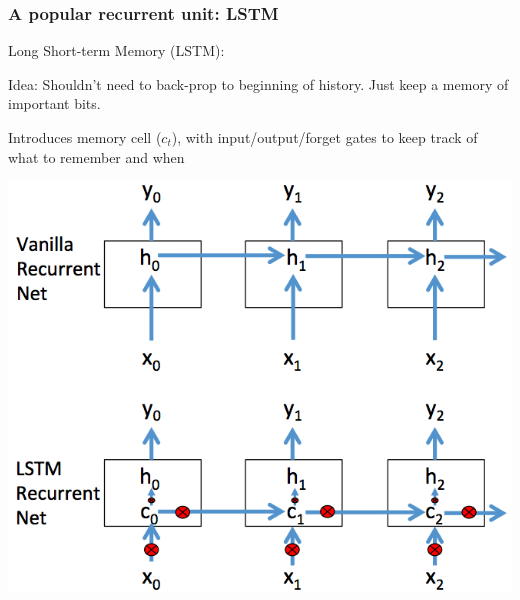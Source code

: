 \begin{frame}
\frametitle{A popular recurrent unit: LSTM}
Long Short-term Memory (LSTM): 
\bi
\item Idea: Shouldn't need to back-prop to beginning of history. Just keep a memory of important bits. \pause
\item Introduces memory cell ($c_t$), with input/output/forget gates to keep track of what to remember and when
\ei
\centerline{\includegraphics[scale=0.28]{figs/lstm_simpleschematic}}
\end{frame}

